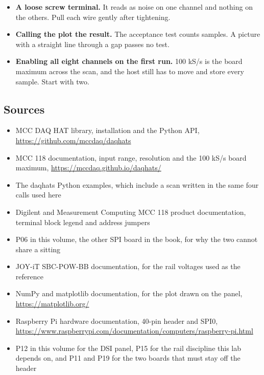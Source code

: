 \begin{itemize}
\item \textbf{A loose screw terminal.} It reads as noise on one channel and nothing on the others. Pull each wire gently after tightening.
\item \textbf{Calling the plot the result.} The acceptance test counts samples. A picture with a straight line through a gap passes no test.
\item \textbf{Enabling all eight channels on the first run.} 100 kS/s is the board maximum across the scan, and the host still has to move and store every sample. Start with two.
\end{itemize}

\subsection*{Sources}

\begin{itemize}
\item MCC DAQ HAT library, installation and the Python API, \url{https://github.com/mccdaq/daqhats}
\item MCC 118 documentation, input range, resolution and the 100 kS/s board maximum, \url{https://mccdaq.github.io/daqhats/}
\item The daqhats Python examples, which include a scan written in the same four calls used here
\item Digilent and Measurement Computing MCC 118 product documentation, terminal block legend and address jumpers
\item P06 in this volume, the other SPI board in the book, for why the two cannot share a sitting
\item JOY-iT SBC-POW-BB documentation, for the rail voltages used as the reference
\item NumPy and matplotlib documentation, for the plot drawn on the panel, \url{https://matplotlib.org/}
\item Raspberry Pi hardware documentation, 40-pin header and SPI0, \url{https://www.raspberrypi.com/documentation/computers/raspberry-pi.html}
\item P12 in this volume for the DSI panel, P15 for the rail discipline this lab depends on, and P11 and P19 for the two boards that must stay off the header
\end{itemize}
